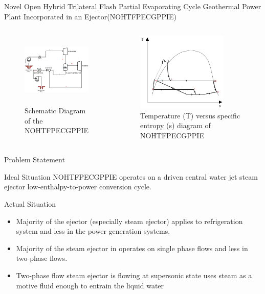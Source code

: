 \begin{frame}{\small Novel Open Hybrid Trilateral Flash Partial Evaporating Cycle Geothermal Power Plant Incorporated in an Ejector(NOHTFPECGPPIE)}
    \begin{columns}
    \begin{figure}[h]
      \centering
      \includegraphics[height=3.5cm]{images/NOHTFPECGPPIE.PNG}
      \caption{\scriptsize \centering Schematic Diagram of the NOHTFPECGPPIE}
      \label{fig:nohtfpecgppieschematicdiagram}
   \end{figure}
    \begin{figure}[h]
    \centering
    \includegraphics[height=3.75cm]{images/nohtfpecgppietsdiagram.jpg}
    \caption{\scriptsize \centering Temperature (T) versus specific entropy (s) diagram of NOHTFPECGPPIE}
    \label{fig:nohtfpecgppietsdiagram}
    \end{figure}
\end{columns}
\end{frame}

\begin{frame}{Problem Statement}
  \begin{block}{Ideal Situation}
   NOHTFPECGPPIE operates on a driven central water jet steam ejector low-enthalpy-to-power conversion cycle.
  \end{block}
  \begin{block}{Actual Situation}
   \begin{itemize}
       \item Majority of the ejector (especially steam ejector) applies to refrigeration system and less in the power generation systems.
       \item  Majority of the steam ejector in operates on single phase flows and less in two-phase flows.
       \item Two-phase flow steam ejector is flowing at supersonic state uses steam as a motive fluid enough to entrain the liquid water
   \end{itemize}
  \end{block}
\end{frame}

